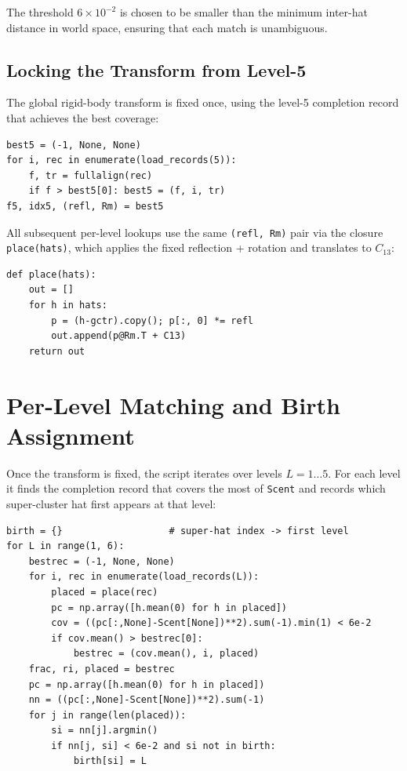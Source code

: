 \documentclass[10pt,a4paper]{article}
\let\polysection\section
\renewcommand\section{\needspace{0.16\textheight}\polysection}
\let\polysubsection\subsection
\renewcommand\subsection{\needspace{0.12\textheight}\polysubsection}
\newcommand{\code}[1]{\texttt{\small #1}}
\begin{document}
\noindent The threshold $6\times 10^{-2}$ is chosen to be smaller than the
minimum inter-hat distance in world space, ensuring that each match is
unambiguous.

\subsection{Locking the Transform from Level-5}

The global rigid-body transform is fixed once, using the level-5 completion
record that achieves the best coverage:

\begin{verbatim}
best5 = (-1, None, None)
for i, rec in enumerate(load_records(5)):
    f, tr = fullalign(rec)
    if f > best5[0]: best5 = (f, i, tr)
f5, idx5, (refl, Rm) = best5
\end{verbatim}

\noindent All subsequent per-level lookups use the same \code{(refl, Rm)} pair via
the closure \code{place(hats)}, which applies the fixed reflection + rotation
and translates to $C_{13}$:

\begin{verbatim}
def place(hats):
    out = []
    for h in hats:
        p = (h-gctr).copy(); p[:, 0] *= refl
        out.append(p@Rm.T + C13)
    return out
\end{verbatim}

\section{Per-Level Matching and Birth Assignment}

Once the transform is fixed, the script iterates over levels $L = 1\ldots 5$.
For each level it finds the completion record that covers the most of
\code{Scent} and records which super-cluster hat first appears at that level:

\begin{verbatim}
birth = {}                   # super-hat index -> first level
for L in range(1, 6):
    bestrec = (-1, None, None)
    for i, rec in enumerate(load_records(L)):
        placed = place(rec)
        pc = np.array([h.mean(0) for h in placed])
        cov = ((pc[:,None]-Scent[None])**2).sum(-1).min(1) < 6e-2
        if cov.mean() > bestrec[0]:
            bestrec = (cov.mean(), i, placed)
    frac, ri, placed = bestrec
    pc = np.array([h.mean(0) for h in placed])
    nn = ((pc[:,None]-Scent[None])**2).sum(-1)
    for j in range(len(placed)):
        si = nn[j].argmin()
        if nn[j, si] < 6e-2 and si not in birth:
            birth[si] = L
\end{verbatim}
\end{document}
